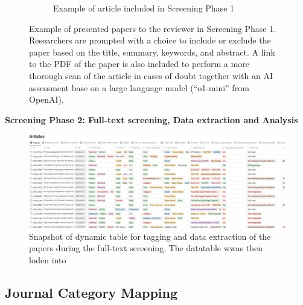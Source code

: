 \begin{figure}[H]
\begin{subfigure}[b]{0.49\textwidth}
         \caption{Example of article included in Screening Phase 1}
         \label{fig:screening_phase_1_included}
     \end{subfigure}
      \caption{Example of presented papers to the reviewer in Screening Phase 1. Researchers are prompted with a choice to include or exclude the paper based on the title, summary, keywords, and abstract. A link to the PDF of the paper is also included to perform a more thorough scan of the article in cases of doubt together with an AI assessment base on a large language model (“o1-mini” from OpenAI).}
    \label{fig:scrining_procces_phase_1}
\end{figure}


\textbf{Screening Phase 2: Full-text screening, Data extraction and Analysis}
\begin{figure}[H]
    \centering
    \includegraphics[width=1\linewidth]{Images/screening_process_tagging.png}
    \caption{Snapshot of dynamic table for tagging and data extraction of the papers during the full-text screening. The datatable wwas then loden into  }
    \label{fig:enter-label}
\end{figure}



\subsection{Journal Category Mapping}
\label{appendix:journal_category_mapping}

